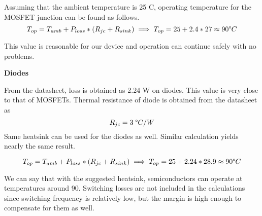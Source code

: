 Assuming that the ambient temperature is 25 C\degree, operating temperature for the MOSFET junction can be found as follows.
$$T_{op} = T_{amb} + P_{loss}*(R_{jc}+R_{sink}) \implies T_{op} = 25 + 2.4*27 \approx 90 \degree C $$

This value is reasonable for our device and operation can continue safely with no problems.

\textbf{Diodes}

From the datasheet, loss is obtained as 2.24 W on diodes. This value is very close to that of MOSFETs. Thermal resistance of diode is obtained from the datasheet as
$$R_{jc} = 3 \; \degree C /W$$
Same heatsink can be used for the diodes as well. Similar calculation yields nearly the same result.

$$T_{op} = T_{amb} + P_{loss}*(R_{jc}+R_{sink}) \implies T_{op} = 25 + 2.24*28.9 \approx 90 \degree C $$

We can say that with the suggested heatsink, semiconductors can operate at temperatures around 90\degreeC. Switching losses are not included in the calculations since switching frequency is relatively low, but the margin is high enough to compensate for them as well. 